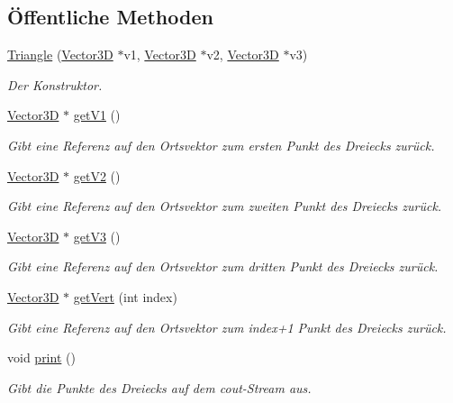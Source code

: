 \subsection*{Öffentliche Methoden}
\begin{DoxyCompactItemize}
\item 
\hyperlink{classTriangle_aa25e2e56ac291e4366474fcbdcc6901b}{Triangle} (\hyperlink{classVector3D}{Vector3\-D} $\ast$v1, \hyperlink{classVector3D}{Vector3\-D} $\ast$v2, \hyperlink{classVector3D}{Vector3\-D} $\ast$v3)
\begin{DoxyCompactList}\small\item\em Der Konstruktor. \end{DoxyCompactList}\item 
\hyperlink{classVector3D}{Vector3\-D} $\ast$ \hyperlink{classTriangle_ae054a0eae5dae026c5af69274c5f277e}{get\-V1} ()
\begin{DoxyCompactList}\small\item\em Gibt eine Referenz auf den Ortsvektor zum ersten Punkt des Dreiecks zurück. \end{DoxyCompactList}\item 
\hyperlink{classVector3D}{Vector3\-D} $\ast$ \hyperlink{classTriangle_a6de5f8560482f4130bdbb96b25aa1b58}{get\-V2} ()
\begin{DoxyCompactList}\small\item\em Gibt eine Referenz auf den Ortsvektor zum zweiten Punkt des Dreiecks zurück. \end{DoxyCompactList}\item 
\hyperlink{classVector3D}{Vector3\-D} $\ast$ \hyperlink{classTriangle_a792a627dc42adad87c0b30e16a6b5824}{get\-V3} ()
\begin{DoxyCompactList}\small\item\em Gibt eine Referenz auf den Ortsvektor zum dritten Punkt des Dreiecks zurück. \end{DoxyCompactList}\item 
\hyperlink{classVector3D}{Vector3\-D} $\ast$ \hyperlink{classTriangle_a9320d1ab83c104352bf5e8f2c8274334}{get\-Vert} (int index)
\begin{DoxyCompactList}\small\item\em Gibt eine Referenz auf den Ortsvektor zum index+1 Punkt des Dreiecks zurück. \end{DoxyCompactList}\item 
void \hyperlink{classTriangle_abc3785b96e03fde1b5f594f8ed6afabb}{print} ()
\begin{DoxyCompactList}\small\item\em Gibt die Punkte des Dreiecks auf dem cout-\/\-Stream aus. \end{DoxyCompactList}\item 

\end{DoxyCompactItemize}
